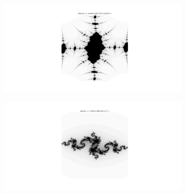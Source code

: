 \documentclass{article}
\begin{document}
\begin{figure}[h!]
  \centering
  \begin{subfigure}[b]{1\linewidth}
    \includegraphics[width=\linewidth]{Fractal_image/3cos(z)+c_-0444+-01131.png}
  \end{subfigure}
  \begin{subfigure}[b]{1\linewidth}
    \includegraphics[width=\linewidth]{Fractal_image/z^2+c_-084+-02166.png}
  \end{subfigure}
\end{figure}

\newpage
\end{document}
